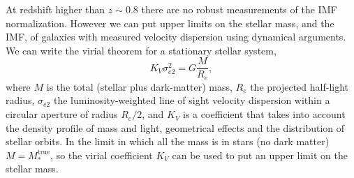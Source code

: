 \documentclass[usenatbib]{mnras}
\def\mtrue{M_*^{\mathrm{true}}}
\begin{document}
At redshift higher than $z\sim0.8$ there are no robust measurements of
the IMF normalization.  However we can put upper limits on the stellar
mass, and the IMF, of galaxies with measured velocity dispersion using
dynamical arguments.  We can write the virial theorem for a stationary
stellar system,
\begin{equation}\label{eq:virial}
K_V\sigma_{e2}^2 = G\frac{M}{R_e},
\end{equation}
where $M$ is the total (stellar plus dark-matter) mass, $R_e$ the
projected half-light radius, $\sigma_{e2}$ the luminosity-weighted
line of sight velocity dispersion within a circular aperture of radius
$R_e/2$, and $K_V$ is a coefficient that takes into account the
density profile of mass and light, geometrical effects and the
distribution of stellar orbits.  In the limit in which all the
  mass is in stars (no dark matter) $M=\mtrue$, so the virial
  coefficient $K_V$ can be used to put an upper limit on the stellar
  mass.
\end{document}

